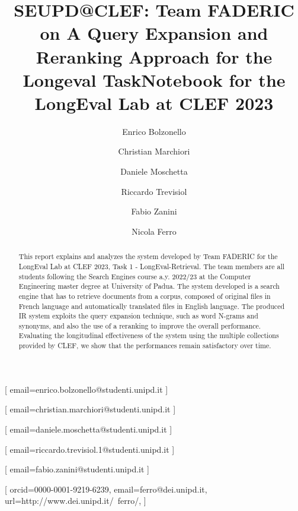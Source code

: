 \documentclass{ceurart}
\begin{document}


\title{SEUPD@CLEF: Team FADERIC on A Query Expansion and Reranking Approach for the Longeval Task}

\title[mode=sub]{Notebook for the LongEval Lab at CLEF 2023}

\author[1]{Enrico Bolzonello}[%
email=enrico.bolzonello@studenti.unipd.it
]

\author[1]{Christian Marchiori}[%
email=christian.marchiori@studenti.unipd.it
]

\author[1]{Daniele Moschetta}[%
email=daniele.moschetta@studenti.unipd.it
]

\author[1]{Riccardo Trevisiol}[%
email=riccardo.trevisiol.1@studenti.unipd.it
]

\author[1]{Fabio Zanini}[%
email=fabio.zanini@studenti.unipd.it
]

\author[1]{Nicola Ferro}[%
orcid=0000-0001-9219-6239,
email=ferro@dei.unipd.it,
url=http://www.dei.unipd.it/~ferro/,
]


\address[1]{University of Padua, Italy}


\begin{abstract}
This report explains and analyzes the system developed by Team FADERIC for the LongEval Lab at CLEF 2023, Task 1 - LongEval-Retrieval. The team members are all students following the Search Engines course a.y. 2022/23 at the Computer Engineering master degree at University of Padua. The system developed is a search engine that has to retrieve documents from a corpus, composed of original files in French language and automatically translated files in English language. The produced IR system exploits the query expansion technique, such as word N-grams and synonyms, and also the use of a reranking to improve the overall performance. Evaluating the longitudinal effectiveness of the system using the multiple collections provided by CLEF, we show that the performances remain satisfactory over time.
\end{abstract}
\end{document}
